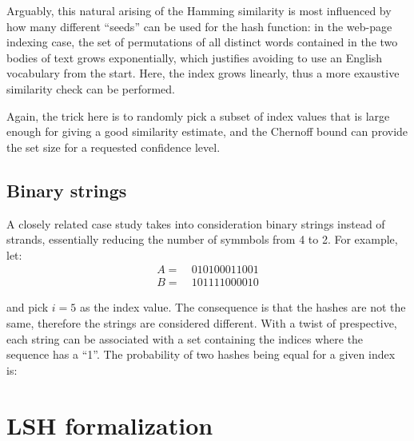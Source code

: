 Arguably, this natural arising of the Hamming similarity is most influenced by how many different ``seeds'' can be used for the hash function: in the web-page indexing case, the set of permutations of all distinct words contained in the two bodies of text grows exponentially, which justifies avoiding to use an English vocabulary from the start. Here, the index grows linearly, thus a more exaustive similarity check can be performed.

Again, the trick here is to randomly pick a subset of index values that is large enough for giving a good similarity estimate, and the Chernoff bound can provide the set size for a requested confidence level.

\subsection{Binary strings}

A closely related case study takes into consideration binary strings instead of \dna{} strands, essentially reducing the number of symmbols from 4 to 2. For example, let:
\begin{align*}
    A =&\ 010100011001 \\
    B =&\ 101111000010
\end{align*}

and pick $i = 5$ as the index value. The consequence is that the hashes are not the same, therefore the strings are considered different. With a twist of prespective, each string can be associated with a set containing the indices where the sequence has a ``1''. The probability of two hashes being equal for a given index is:



\section{LSH formalization}


